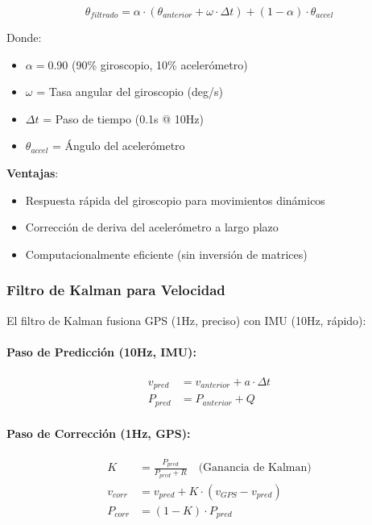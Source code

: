 \documentclass[11pt,a4paper]{article}
\begin{document}
\begin{equation}
\theta_{filtrado} = \alpha \cdot (\theta_{anterior} + \omega \cdot \Delta t) + (1-\alpha) \cdot \theta_{accel}
\end{equation}

Donde:
\begin{itemize}
    \item $\alpha = 0.90$ (90\% giroscopio, 10\% acelerómetro)
    \item $\omega$ = Tasa angular del giroscopio (deg/s)
    \item $\Delta t$ = Paso de tiempo (0.1s @ 10Hz)
    \item $\theta_{accel}$ = Ángulo del acelerómetro
\end{itemize}

\textbf{Ventajas}:
\begin{itemize}
    \item Respuesta rápida del giroscopio para movimientos dinámicos
    \item Corrección de deriva del acelerómetro a largo plazo
    \item Computacionalmente eficiente (sin inversión de matrices)
\end{itemize}

\subsubsection{Filtro de Kalman para Velocidad}

El filtro de Kalman fusiona GPS (1Hz, preciso) con IMU (10Hz, rápido):

\paragraph{Paso de Predicción (10Hz, IMU):}
\begin{align}
v_{pred} &= v_{anterior} + a \cdot \Delta t \\
P_{pred} &= P_{anterior} + Q
\end{align}

\paragraph{Paso de Corrección (1Hz, GPS):}
\begin{align}
K &= \frac{P_{pred}}{P_{pred} + R} \quad \text{(Ganancia de Kalman)} \\
v_{corr} &= v_{pred} + K \cdot (v_{GPS} - v_{pred}) \\
P_{corr} &= (1 - K) \cdot P_{pred}
\end{align}
\end{document}
